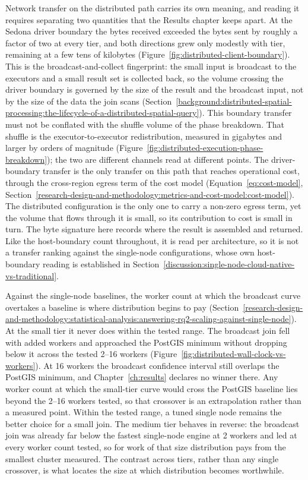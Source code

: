 Network transfer on the distributed path carries its own meaning, and reading it requires separating two quantities that the Results chapter keeps apart. At the Sedona driver boundary the bytes received exceeded the bytes sent by roughly a factor of two at every tier, and both directions grew only modestly with tier, remaining at a few tens of kilobytes (Figure~\ref{fig:distributed-client-boundary}). This is the broadcast-and-collect fingerprint: the small input is broadcast to the executors and a small result set is collected back, so the volume crossing the driver boundary is governed by the size of the result and the broadcast input, not by the size of the data the join scans \parencite{yu2019_geospark_perspective_beyond} (Section~\ref{background:distributed-spatial-processing:the-lifecycle-of-a-distributed-spatial-query}). This boundary transfer must not be conflated with the shuffle volume of the phase breakdown. That shuffle is the executor-to-executor redistribution, measured in gigabytes and larger by orders of magnitude (Figure~\ref{fig:distributed-execution-phase-breakdown}); the two are different channels read at different points. The driver-boundary transfer is the only transfer on this path that reaches operational cost, through the cross-region egress term of the cost model (Equation~\ref{eq:cost-model}, Section~\ref{research-design-and-methodology:metrics-and-cost-model:cost-model}). The distributed configuration is the only one to carry a non-zero egress term, yet the volume that flows through it is small, so its contribution to cost is small in turn. The byte signature here records where the result is assembled and returned. Like the host-boundary count throughout, it is read per architecture, so it is not a transfer ranking against the single-node configurations, whose own host-boundary reading is established in Section~\ref{discussion:single-node-cloud-native-vs-traditional}.

Against the single-node baselines, the worker count at which the broadcast curve overtakes a baseline is where distribution begins to pay (Section~\ref{research-design-and-methodology:statistical-analysis:answering-rq2-scaling-against-single-node}). At the small tier it never does within the tested range. The broadcast join fell with added workers and approached the PostGIS minimum without dropping below it across the tested \numrange{2}{16} workers (Figure~\ref{fig:distributed-wall-clock-vs-workers}). At \num{16} workers the broadcast confidence interval still overlaps the PostGIS minimum, and Chapter~\ref{ch:results} declares no winner there. Any worker count at which the small-tier curve would cross the PostGIS baseline lies beyond the \numrange{2}{16} workers tested, so that crossover is an extrapolation rather than a measured point. Within the tested range, a tuned single node remains the better choice for a small join. The medium tier behaves in reverse: the broadcast join was already far below the fastest single-node engine at \num{2} workers and led at every worker count tested, so for work of that size distribution pays from the smallest cluster measured. The contrast across tiers, rather than any single crossover, is what locates the size at which distribution becomes worthwhile.

